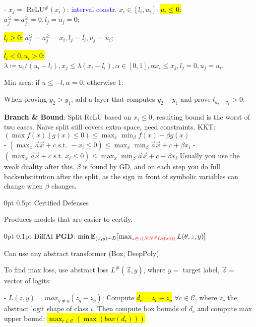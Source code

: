 \documentclass[11pt,landscape,a4paper,fleqn]{article}
\makeatletter
\renewcommand{\section}{\@startsection{section}{1}{0mm}%
                                {0pt}%
                                {0.5pt}%
                                {\color{myorange}\sffamily\small\bfseries}}
\renewcommand{\subsection}{\@startsection{subsection}{1}{0mm}%
                                {0pt}%
                                {0.1pt}%
                            	{\color{myorange2}\sffamily\small}}
\newcommand{\mhl}[1]{#1}
\makeatother
\begin{document}
\begin{multicols*}{4}
- $x_j =$ ReLU$^\#(x_i)$: \textcolor{blue}{interval constr.} $x_i \in [l_i, u_i]$:
\hl{$u_i \leq 0$:} $a_j^\leq = a_j^\geq = 0, l_j = u_j = 0$;

\hl{$l_i \geq 0$:} $a_j^\leq = a_j^\geq = x_i, l_j = l_i, u_j = u_i$;

\hl{$l_i < 0, u_i > 0$:} \(\lambda \coloneqq u_i / (u_i - l_i), x_j \leq \lambda (x_i - l_i),
\alpha \in [0, 1], \alpha x_i \leq x_j, l_j = 0, u_j = u_i\).

Min area: if \(u \leq - l, \alpha = 0\), otherwise \(1\).

When proving $y_2 > y_1$, add a layer that computes $y_2 - y_1$ and prove $l_{y_2 - y_1} > 0$.

\textbf{Branch \& Bound}: Split ReLU based on \(x_i \leq 0\), resulting bound is the worst of two cases.
Naive split still covers extra space, need constraints. KKT:
\((\max f(x) \mid g(x) \leq 0) \leq \max_x \min_\beta f(x) - \beta g(x)\)\\
- \((\max_x \vec{a}\vec{x} + c \text { s.t. } -x_i \leq 0) \leq \max_x \min_\beta \vec{a}\vec{x} + c + \beta x_i\)
- \((\max_x \vec{a}\vec{x} + c \text { s.t. } x_i \leq 0) \leq \max_x \min_\beta \vec{a}\vec{x} + c - \beta x_i\)
Usually you use the weak duality after this. \(\beta\) is found by GD, and on each step you do full backsubstitution after the split, as the sign in front of symbolic variables can change when \(\beta\) changes.

\section{Certified Defenses}

Produces models that are easier to certify.

\subsection{DiffAI}
\textbf{PGD}:
\mhl{$\min \mathbb{E}_{(x,y) \sim D} [ \max_{\textcolor{red}{z \in \gamma(NN^\#(S(x)))}} L(\theta, \textcolor{red}{z}, y) ]$}

Can use any abstract transformer (Box, DeepPoly).

To find max loss, use abstract loss $L^\#(\vec{z}, y)$, where $y = $ target label, $\vec{z} = $ vector of logits:

- $L(z, y) = max_{q \neq y} (z_q - z_y)$: Compute \hl{$d_c = z_c - z_y$} \(\forall c \in \mathcal{C}\), where $z_c$ the abstract logit shape of class $i$. Then compute box bounds of $d_c$ and compute max upper bound: \hl{$\max_{c \in \mathcal{C}}(\max(box(d_c)))$}


\end{multicols*}
\end{document}
